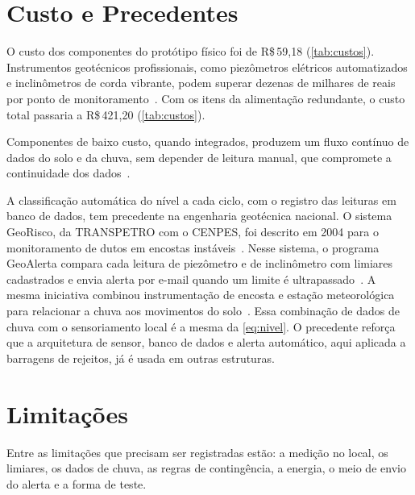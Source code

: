 \section{Custo e Precedentes}
\label{sec:disc-precedentes}

O custo dos componentes do protótipo físico foi de R\$\,59,18
(\autoref{tab:custos}). Instrumentos geotécnicos profissionais, como
piezômetros elétricos automatizados e inclinômetros de corda vibrante,
podem superar dezenas de milhares de reais por ponto de monitoramento~\cite{quispe2018instrumentacao}.
Com os itens da alimentação redundante, o custo total passaria a R\$\,421,20 (\autoref{tab:custos}).

Componentes de baixo custo, quando integrados, produzem um fluxo contínuo
de dados do solo e da chuva, sem depender de leitura manual, que
compromete a continuidade dos dados~\cite{anm2019relatorio,
ibram2020tecnologias}.

A classificação automática do nível a cada ciclo, com o registro das
leituras em banco de dados, tem precedente na engenharia geotécnica
nacional. O sistema GeoRisco, da TRANSPETRO com o CENPES, foi descrito
em 2004 para o monitoramento de dutos em encostas instáveis~\cite{rocha2004georisco}.
Nesse sistema, o programa GeoAlerta compara cada leitura de piezômetro e
de inclinômetro com limiares cadastrados e envia alerta por e-mail quando
um limite é ultrapassado~\cite{rocha2004georisco}. A mesma iniciativa
combinou instrumentação de encosta e estação meteorológica para
relacionar a chuva aos movimentos do solo~\cite{costa2004pipeline}.
Essa combinação de dados de chuva com o sensoriamento local é a mesma da
\autoref{eq:nivel}. O precedente reforça que a arquitetura de sensor,
banco de dados e alerta automático, aqui aplicada a barragens de
rejeitos, já é usada em outras estruturas.

\section{Limitações}
\label{sec:limitacoes}

Entre as limitações que precisam ser registradas estão: a medição no
local, os limiares, os dados de chuva, as regras de contingência, a
energia, o meio de envio do alerta e a forma de teste.

